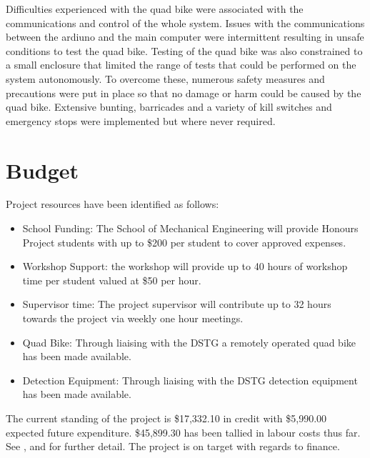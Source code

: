 \documentclass[main.tex]{subfiles}
\begin{document}
Difficulties experienced with the quad bike were associated with the communications and control of the  whole system. Issues with the communications between the ardiuno and the main computer were intermittent resulting in unsafe conditions to test the quad bike. Testing of the quad bike was also constrained to a small enclosure that limited the range of tests that could be performed on the system autonomously. To overcome these, numerous safety measures and precautions were put in place so that no damage or harm could be caused by the quad bike. Extensive bunting, barricades and a variety of kill switches and emergency stops were implemented but where never required. 

\section{Budget}
Project resources have been identified as follows:
\begin{itemize}
\item School Funding: The School of Mechanical Engineering will provide Honours Project students with up to \$200 per student to cover approved expenses.
\item Workshop Support: the workshop will provide up to 40 hours of workshop time per student valued at \$50 per hour.
\item Supervisor time: The project supervisor will contribute up to 32 hours towards the project via weekly one hour meetings.
\item Quad Bike: Through liaising with the DSTG a remotely operated quad bike has been made available.
\item Detection Equipment: Through liaising with the DSTG detection equipment has been made available.
\end{itemize}
The current standing of the project is \$17,332.10 in credit with \$5,990.00 expected future expenditure. \$45,899.30 has been tallied in labour costs thus far. See , and  for further detail. The project is on target with regards to finance. 
\end{document}
